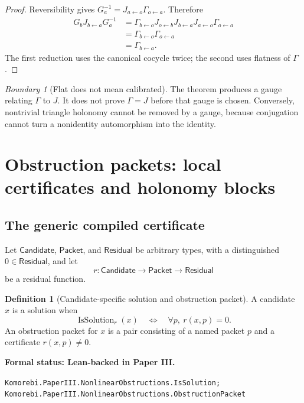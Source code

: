 \documentclass[11pt]{article}
\theoremstyle{definition}
\newtheorem{definition}[theorem]{Definition}
\theoremstyle{remark}
\newtheorem{boundary}[theorem]{Boundary}
\newcommand{\leanname}[1]{\nolinkurl{#1}}
\newcommand{\statusleanthree}[1]{%
  \par\smallskip\noindent
  {\color{leanblue}\textbf{Formal status: Lean-backed in Paper III.}}\par
  \begingroup\small\raggedright\leanname{#1}\par\endgroup\smallskip}
\begin{document}
\begin{proof}
Reversibility gives
$G_a^{-1}=J_{a\leftarrow o}\Gamma_{o\leftarrow a}$.  Therefore
\[
\begin{aligned}
G_bJ_{b\leftarrow a}G_a^{-1}
&=
\Gamma_{b\leftarrow o}
J_{o\leftarrow b}J_{b\leftarrow a}
J_{a\leftarrow o}
\Gamma_{o\leftarrow a}\\
&=
\Gamma_{b\leftarrow o}\Gamma_{o\leftarrow a}\\
&=
\Gamma_{b\leftarrow a}.
\end{aligned}
\]
The first reduction uses the canonical cocycle twice; the second uses
flatness of $\Gamma$.
\end{proof}

\begin{boundary}[Flat does not mean calibrated]
The theorem produces a gauge relating $\Gamma$ to $J$.  It does not prove
$\Gamma=J$ before that gauge is chosen.  Conversely, nontrivial triangle
holonomy cannot be removed by a gauge, because conjugation cannot turn a
nonidentity automorphism into the identity.
\end{boundary}

\section{Obstruction packets: local certificates and holonomy blocks}
\label{sec:obstruction-packets}

\subsection{The generic compiled certificate}

Let $\mathsf{Candidate}$, $\mathsf{Packet}$, and $\mathsf{Residual}$ be
arbitrary types, with a distinguished
$0\in\mathsf{Residual}$, and let
\[
r:\mathsf{Candidate}\longrightarrow
\mathsf{Packet}\longrightarrow\mathsf{Residual}
\]
be a residual function.

\begin{definition}[Candidate-specific solution and obstruction packet]
\label{def:generic-obstruction}
A candidate $x$ is a solution when
\[
\operatorname{IsSolution}_r(x)
\quad\Longleftrightarrow\quad
\forall p,\ r(x,p)=0.
\]
An obstruction packet for $x$ is a pair consisting of a named packet $p$
and a certificate $r(x,p)\ne0$.
\end{definition}
\statusleanthree{Komorebi.PaperIII.NonlinearObstructions.IsSolution; Komorebi.PaperIII.NonlinearObstructions.ObstructionPacket}
\end{document}
